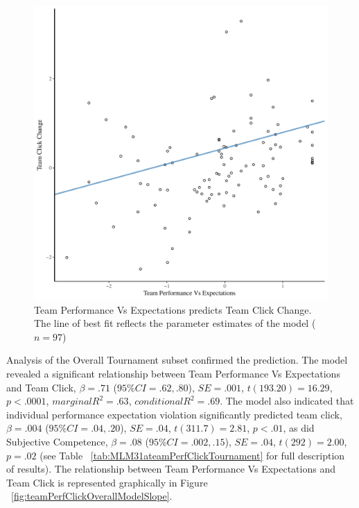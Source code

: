 \begin{CJK}{UTF8}{gbsn}


    \begin{figure}[htbp]
      \centering
    \includegraphics[scale=.5]{images/teamPerfClickDeltaModelSlope.pdf}
      \caption{Team Performance Vs Expectations predicts Team Click Change. The line of best fit reflects the parameter estimates of the model ($n = 97$)}
      \label{fig:teamPerfClickDeltaModelSlope}
    \end{figure}


Analysis of the Overall Tournament subset confirmed the prediction.
The model revealed a significant relationship between Team Performance Vs Expectations  and Team Click, $\beta = .71$ ($95\% CI = .62, .80$), $SE = .001$, $t(193.20) = 16.29$, $p < .0001$, $marginal R^2 = .63$, $conditional R^2 = .69$.
The model also indicated that individual performance expectation violation significantly predicted team click, $\beta = .004$ ($95\% CI =  .04, .20$), $SE = .04$, $t(311.7) = 2.81$, $p < .01$, as did Subjective Competence, $\beta = .08$ ($95\% CI =  .002, .15$), $SE = .04$, $t(292) = 2.00$, $p = .02$  (see Table ~\ref{tab:MLM31ateamPerfClickTournament} for full description of results).  The relationship between Team Performance Vs Expectations  and Team Click is represented graphically in Figure ~\ref{fig:teamPerfClickOverallModelSlope}.


\end{CJK}
